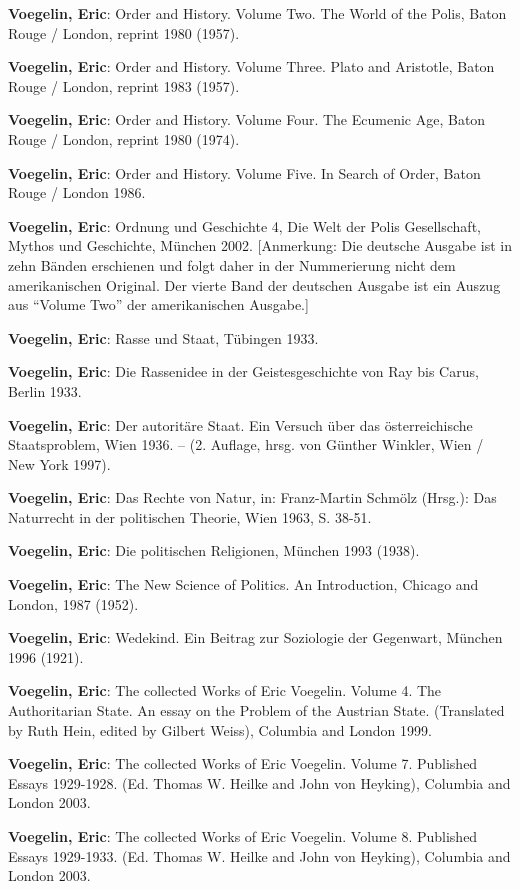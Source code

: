 \documentclass[12pt,a4paper,ngerman]{article}
\begin{document}
{\bf Voegelin, Eric}: Order and History. Volume Two. The World of the
Polis, Baton Rouge / London, reprint 1980 (1957).

{\bf Voegelin, Eric}: Order and History. Volume Three. Plato and
Aristotle, Baton Rouge / London, reprint 1983 (1957).

{\bf Voegelin, Eric}: Order and History. Volume Four. The Ecumenic
Age, Baton Rouge / London, reprint 1980 (1974).

{\bf Voegelin, Eric}: Order and History. Volume Five. In Search of
Order, Baton Rouge / London 1986.

{\bf Voegelin, Eric}: Ordnung und Geschichte 4, Die Welt der Polis
Gesellschaft, Mythos und Geschichte, München 2002. [Anmerkung: Die deutsche
Ausgabe ist in zehn Bänden erschienen und folgt daher in der Nummerierung
nicht dem amerikanischen Original. Der vierte Band der deutschen Ausgabe ist
ein Auszug aus "`Volume Two"' der amerikanischen Ausgabe.]

{\bf Voegelin, Eric}: Rasse und Staat, Tübingen 1933.

{\bf Voegelin, Eric}: Die Rassenidee in der Geistesgeschichte von Ray
bis Carus, Berlin 1933.

{\bf Voegelin, Eric}: Der autoritäre Staat. Ein Versuch über das
österreichische Staatsproblem, Wien 1936. -- (2. Auflage, hrsg. von
Günther Winkler, Wien / New York 1997).

{\bf Voegelin, Eric}: Das Rechte von Natur, in: Franz-Martin Schmölz (Hrsg.):
Das Naturrecht in der politischen Theorie, Wien 1963, S. 38-51.

{\bf Voegelin, Eric}: Die politischen Religionen, München 1993 (1938).

{\bf Voegelin, Eric}: The New Science of Politics. An Introduction, Chicago
and London, 1987 (1952).

{\bf Voegelin, Eric}: Wedekind. Ein Beitrag zur Soziologie der
Gegenwart, München 1996 (1921).

{\bf Voegelin, Eric}: The collected Works of Eric Voegelin. Volume 4.
The Authoritarian State. An essay on the Problem of the Austrian
State. (Translated by Ruth Hein, edited by Gilbert Weiss), Columbia
and London 1999.

{\bf Voegelin, Eric}: The collected Works of Eric Voegelin. Volume 7.
Published Essays 1929-1928. (Ed. Thomas W. Heilke and John von
Heyking), Columbia and London 2003.

{\bf Voegelin, Eric}: The collected Works of Eric Voegelin. Volume 8.
Published Essays 1929-1933. (Ed. Thomas W. Heilke and John von
Heyking), Columbia and London 2003.
\end{document}
